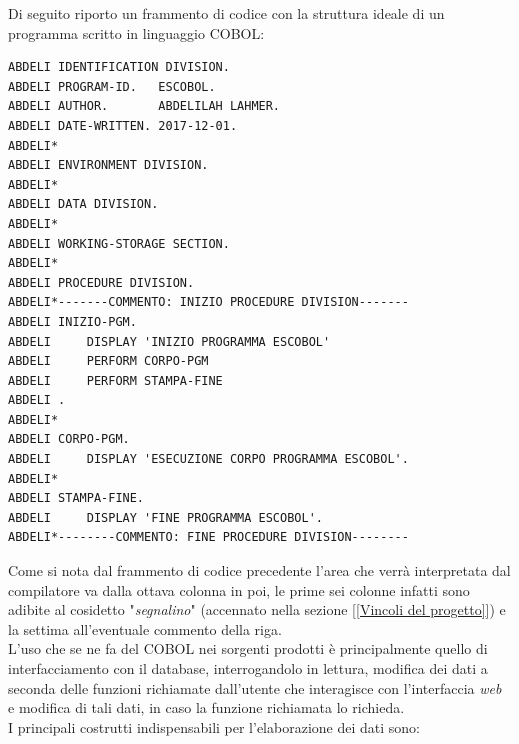 Di seguito riporto un frammento di codice con la struttura ideale di un programma scritto in linguaggio COBOL:\\

\begin{lstlisting}[language=cobol]
ABDELI IDENTIFICATION DIVISION.
ABDELI PROGRAM-ID.   ESCOBOL.
ABDELI AUTHOR.       ABDELILAH LAHMER.
ABDELI DATE-WRITTEN. 2017-12-01.
ABDELI*
ABDELI ENVIRONMENT DIVISION.
ABDELI*
ABDELI DATA DIVISION.
ABDELI*
ABDELI WORKING-STORAGE SECTION.                         
ABDELI*
ABDELI PROCEDURE DIVISION.
ABDELI*-------COMMENTO: INIZIO PROCEDURE DIVISION-------
ABDELI INIZIO-PGM.
ABDELI     DISPLAY 'INIZIO PROGRAMMA ESCOBOL'
ABDELI 	   PERFORM CORPO-PGM
ABDELI     PERFORM STAMPA-FINE
ABDELI .
ABDELI*
ABDELI CORPO-PGM.
ABDELI     DISPLAY 'ESECUZIONE CORPO PROGRAMMA ESCOBOL'.
ABDELI*
ABDELI STAMPA-FINE.
ABDELI     DISPLAY 'FINE PROGRAMMA ESCOBOL'.
ABDELI*--------COMMENTO: FINE PROCEDURE DIVISION--------
\end{lstlisting}
Come si nota dal frammento di codice precedente l'area che verrà interpretata dal compilatore va dalla ottava colonna in poi, le prime sei colonne infatti sono adibite al cosidetto "\textit{segnalino}" (accennato nella sezione [\ref{Vincoli del progetto}]) e la settima all'eventuale commento della riga.\\


L'uso che se ne fa del COBOL nei sorgenti prodotti è principalmente quello di interfacciamento con il database, interrogandolo in lettura, modifica dei dati a seconda delle funzioni richiamate dall'utente che interagisce con l'interfaccia \textit{web} e modifica di tali dati, in caso la funzione richiamata lo richieda.\\

I principali costrutti indispensabili per l'elaborazione dei dati sono:

